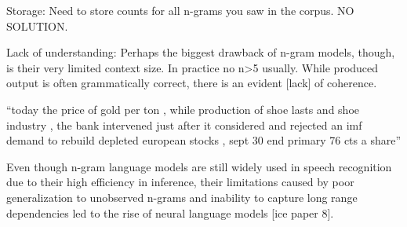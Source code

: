 Storage: Need to store counts for all n-grams you saw in the corpus. NO SOLUTION.

Lack of understanding: Perhaps the biggest drawback of n-gram models, though, is their very limited context size. In practice no n>5 usually. While produced output is often grammatically correct, there is an evident [lack] of coherence.

“today the price of gold per ton , while production of shoe lasts and shoe industry , the bank intervened just after it considered and rejected an imf demand to rebuild depleted european stocks , sept 30 end primary 76 cts a share”

Even though n-gram language models are still widely used in speech recognition due to their high efficiency in inference, their limitations caused by poor generalization to unobserved n-grams and inability to capture long range dependencies led to the rise of neural language models [ice paper 8].
